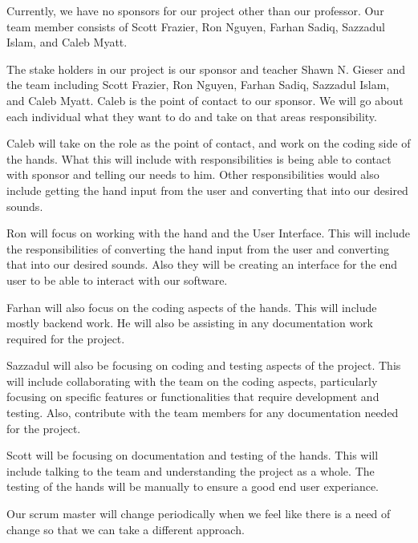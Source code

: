 Currently, we have no sponsors for our project other than our professor. Our team member consists of Scott Frazier, Ron Nguyen, Farhan Sadiq, Sazzadul Islam, and Caleb Myatt.

The stake holders in our project is our sponsor and teacher Shawn N. Gieser and the team including Scott Frazier, Ron Nguyen, Farhan Sadiq, Sazzadul Islam, and Caleb Myatt. Caleb is the point of contact to our sponsor. We will go about each individual what they want to do and take on that areas responsibility. 

Caleb will take on the role as the point of contact, and work on the coding side of the hands. What this will include with responsibilities is being able to contact with sponsor and telling our needs to him. Other responsibilities would also include getting the hand input from the user and converting that into our desired sounds. 

Ron will focus on working with the hand and the User Interface. This will include the responsibilities of converting the hand input from the user and converting  that into our desired sounds. Also they will be creating an interface for the end user to be able to interact with our software. 

Farhan will also focus on the coding aspects of the hands. This will include mostly backend work. He will also be assisting in any documentation work required for the project.

Sazzadul will also be focusing on coding and testing aspects of the project. This will include collaborating with the team on the coding aspects, particularly focusing on specific features or functionalities that require development and testing. Also, contribute with the team members for any documentation needed for the project.    

Scott will be focusing on documentation and testing of the hands. This will include talking to the team and understanding the project as a whole. The testing of the hands will be manually to ensure a good end user experiance. 

Our scrum master will change periodically when we feel like there is a need of change so that we can take a different approach. 
